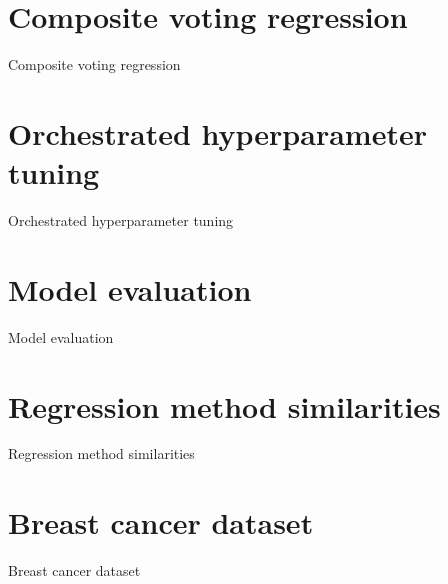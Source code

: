 \documentclass{beamer}
\begin{document}
\section{Composite voting regression}
\begin{frame}{Composite voting regression}
\end{frame}

\section{Orchestrated hyperparameter tuning}
\begin{frame}{Orchestrated hyperparameter tuning}
\end{frame}

\section{Model evaluation}
\begin{frame}{Model evaluation}
\end{frame}

\section{Regression method similarities}
\begin{frame}{Regression method similarities}
\end{frame}

\section{Breast cancer dataset}
\begin{frame}{Breast cancer dataset}
\end{frame}
\end{document}
